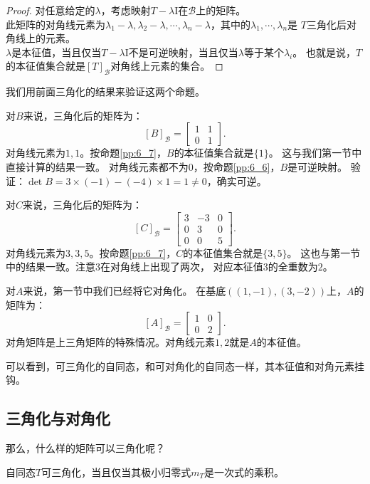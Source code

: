 \documentclass[12pt,UTF8,fontset=none]{ctexbook}
\begin{document}
\begin{proof} %
    对任意给定的$\lambda$，考虑映射$T - \lambda\mathrm{I}$在$\mathcal{B}$上的矩阵。\\
    此矩阵的对角线元素为$\lambda_1 - \lambda, \lambda_2 - \lambda, \cdots , \lambda_n - \lambda$，其中的$\lambda_1, \cdots, \lambda_n$是
    $T$三角化后对角线上的元素。\\
    $\lambda$是本征值，当且仅当$T - \lambda\mathrm{I}$不是可逆映射，当且仅当$\lambda$等于某个$\lambda_i$。
    也就是说，$T$的本征值集合就是$[T]_\mathcal{B}$对角线上元素的集合。

\end{proof}

我们用前面三角化的结果来验证这两个命题。

对$B$来说，三角化后的矩阵为：
$$
[B]_{\mathcal{B}} = \begin{bmatrix} 1 & 1 \\ 0 & 1 \end{bmatrix}.
$$
对角线元素为$1, 1$。按命题\ref{pp:6_7}，$B$的本征值集合就是$\{1\}$。
这与我们第一节中直接计算的结果一致。
对角线元素都不为$0$，按命题\ref{pp:6_6}，$B$是可逆映射。
验证：$\det B = 3 \times (-1) - (-4) \times 1 = 1 \neq 0$，确实可逆。

对$C$来说，三角化后的矩阵为：
$$
[C]_{\mathcal{B}} = \begin{bmatrix} 3 & -3 & 0 \\ 0 & 3 & 0 \\ 0 & 0 & 5 \end{bmatrix}.
$$
对角线元素为$3, 3, 5$。按命题\ref{pp:6_7}，$C$的本征值集合就是$\{3, 5\}$。
这也与第一节中的结果一致。注意$3$在对角线上出现了两次，
对应本征值$3$的全重数为$2$。

对$A$来说，第一节中我们已经将它对角化。
在基底$((1,-1), (3,-2))$上，$A$的矩阵为：
$$
[A]_{\mathcal{B}} = \begin{bmatrix} 1 & 0 \\ 0 & 2 \end{bmatrix}.
$$
对角矩阵是上三角矩阵的特殊情况。对角线元素$1, 2$就是$A$的本征值。

可以看到，可三角化的自同态，和可对角化的自同态一样，其本征值和对角元素挂钩。

\subsection{三角化与对角化}
那么，什么样的矩阵可以三角化呢？

\begin{pp}\label{pp:6_8}
    自同态$T$可三角化，当且仅当其极小归零式$m_T$是一次式的乘积。
\end{pp}
\end{document}
